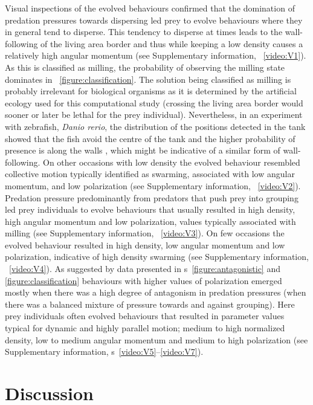 Visual inspections of the evolved behaviours confirmed that the domination of predation pressures towards dispersing led prey to evolve behaviours where they in general tend to disperse. This tendency to disperse at times leads to the wall-following of the living area border and thus while keeping a low density causes a relatively high angular momentum (see Supplementary information, \videoname~\ref{video:V1}). As this is classified as milling, the probability of observing the milling state dominates in \figurename~\ref{figure:classification}. The solution being classified as milling is probably irrelevant for biological organisms as it is determined by the artificial ecology used for this computational study (\ie crossing the living area border would sooner or later be lethal for the prey individual). Nevertheless, in an experiment with zebrafish, \emph{Danio rerio}, the distribution of the positions detected in the tank showed that the fish avoid the centre of the tank and the higher probability of presence is along the walls \cite{collignon2016stochastic}, which might be indicative of a similar form of wall-following. On other occasions with low density the evolved behaviour resembled collective motion typically identified as swarming, associated with low angular momentum, and low polarization (see Supplementary information, \videoname~\ref{video:V2}). Predation pressure predominantly from predators that push prey into grouping led prey individuals to evolve behaviours that usually resulted in high density, high angular momentum and low polarization, values typically associated with milling (see Supplementary information, \videoname~\ref{video:V3}). On few occasions the evolved behaviour resulted in high density, low angular momentum and low polarization, indicative of high density swarming (see Supplementary information, \videoname~\ref{video:V4}). As suggested by data presented in \figurename s~\ref{figure:antagonistic} and \ref{figure:classification} behaviours with higher values of polarization emerged mostly when there was a high degree of antagonism in predation pressures (\ie when there was a balanced mixture of pressure towards and against grouping). Here prey individuals often evolved behaviours that resulted in parameter values typical for dynamic and highly parallel motion; medium to high normalized density, low to medium angular momentum and medium to high polarization (see Supplementary information, \videoname s~\ref{video:V5}--\ref{video:V7}).

\section{Discussion}

